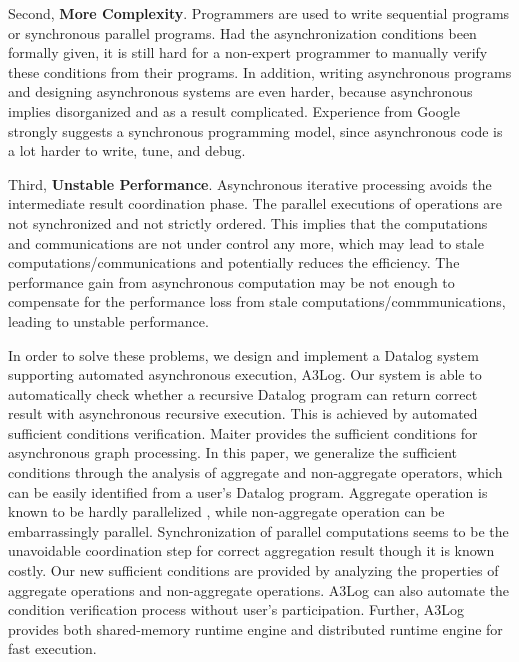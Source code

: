 \documentclass{vldb}
\begin{document}
Second, \textbf{More Complexity}. Programmers are used to write sequential programs or synchronous parallel programs. Had the asynchronization conditions been formally given, it is still hard for a non-expert programmer to manually verify these conditions from their programs. In addition, writing asynchronous programs and designing asynchronous systems are even harder, because asynchronous implies disorganized and as a result complicated. Experience from Google \cite{} strongly suggests a synchronous programming model, since asynchronous code is a lot harder to write, tune, and debug.

Third, \textbf{Unstable Performance}. Asynchronous iterative processing avoids the intermediate result coordination phase. The parallel executions of operations are not synchronized and not strictly ordered. This implies that the computations and communications are not under control any more, which may lead to stale computations/communications and potentially reduces the efficiency. The performance gain from asynchronous computation may be not enough to compensate for the performance loss from stale computations/commmunications, leading to unstable performance.


In order to solve these problems, we design and implement a Datalog system supporting automated asynchronous execution, A3Log. Our system is able to automatically check whether a recursive Datalog program can return correct result with asynchronous recursive execution. This is achieved by automated sufficient conditions verification. Maiter \cite{} provides the sufficient conditions for asynchronous graph processing. In this paper, we generalize the sufficient conditions through the analysis of aggregate and non-aggregate operators, which can be easily identified from a user's Datalog program. Aggregate operation is known to be hardly parallelized \cite{distribute aggregate from ms}, while non-aggregate operation can be embarrassingly parallel. Synchronization of parallel computations seems to be the unavoidable coordination step for correct aggregation result though it is known costly. Our new sufficient conditions are provided by analyzing the properties of aggregate operations and non-aggregate operations. A3Log can also automate the condition verification process without user's participation. Further, A3Log provides both shared-memory runtime engine and distributed runtime engine for fast execution.
\end{document}
